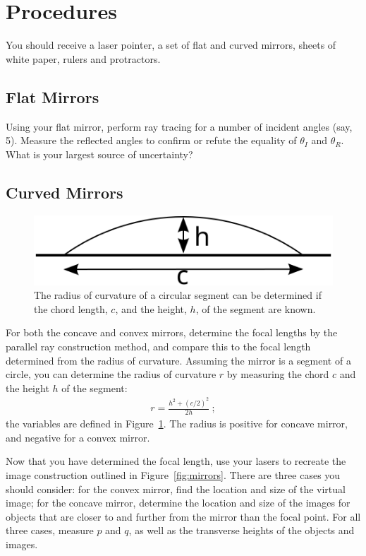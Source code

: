 \documentclass[12pt]{article}
\begin{document}
\section{Procedures}
\label{sec:procedures}

You should receive a laser pointer, a set of flat and curved mirrors,
sheets of white paper, rulers and protractors.  

\subsection{Flat Mirrors}
\label{sec:flat}

Using your flat mirror, perform ray tracing for a number of incident
angles (say, 5).  Measure the reflected angles to confirm or refute
the equality of $\theta_I$ and $\theta_R$.  What is your largest
source of uncertainty?

\subsection{Curved Mirrors}
\label{sec:curved}

\begin{figure}
  \centering
  \includegraphics[width=\textwidth/2]{figures/chord}
  \caption{The radius of curvature of a circular segment can be
    determined if the chord length, $c$, and the height, $h$, of the
    segment are known.}
  \label{fig:chord}
\end{figure}
For both the concave and convex mirrors, determine the focal lengths by
the parallel ray construction method, and compare this to the focal
length determined from the radius of curvature.  Assuming the mirror
is a segment of a circle, you can determine the radius of curvature
$r$ by measuring the chord $c$ and the height $h$ of the segment:
\begin{gather*}
  r = \frac{h^2 + (c/2)^2}{2h}\ ;
\end{gather*}
the variables are defined in Figure~\ref{fig:chord}.  The radius is
positive for concave mirror, and negative for a convex mirror.

Now that you have determined the focal length, use your lasers to
recreate the image construction outlined in Figure~\ref{fig:mirrors}.
There are three cases you should consider: for the convex mirror, find
the location and size of the virtual image; for the concave mirror,
determine the location and size of the images for objects that are
closer to and further from the mirror than the focal point.  For all
three cases, measure $p$ and $q$, as well as the transverse heights of
the objects and images.
\end{document}

